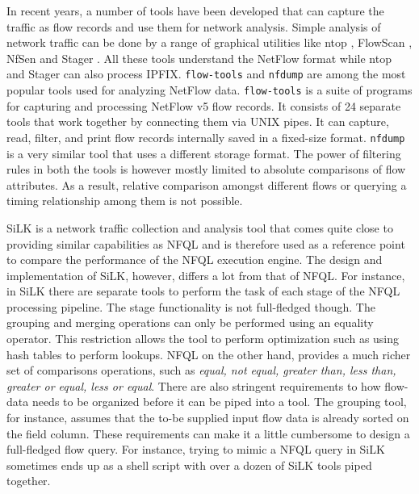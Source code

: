 In recent years, a number of tools have been developed that can capture the
traffic as flow records and use them for network analysis. Simple analysis of
network traffic can be done by a range of graphical utilities like ntop
\cite{ntop:2000}, FlowScan \cite{flowscan:2000}, NfSen \cite{phaag:2006} and
Stager \cite{oslebo:2006}. All these tools understand the NetFlow format while
ntop and Stager can also process \ac{IPFIX}. \texttt{flow-tools} and
\texttt{nfdump} are among the most popular tools used for analyzing NetFlow
data. \texttt{flow-tools} \cite{sromig:2000} is a suite of programs for
capturing and processing NetFlow v5 flow records. It consists of 24 separate
tools that work together by connecting them via UNIX pipes. It can capture,
read, filter, and print flow records internally saved in a fixed-size format.
\texttt{nfdump} \cite{phaag:2006} is a very similar tool that uses a different
storage format. The power of filtering rules in both the tools is however
mostly limited to absolute comparisons of flow attributes. As a result,
relative comparison amongst different flows or querying a timing relationship
among them is not possible.


SiLK \cite{SiLK} is a network traffic collection and analysis tool that comes
quite close to providing similar capabilities as \ac{NFQL} and is therefore
used as a reference point to compare the performance of the \ac{NFQL}
execution engine. The design and implementation of SiLK, however, differs a
lot from that of \ac{NFQL}. For instance, in SiLK there are separate tools to
perform the task of each stage of the \ac{NFQL} processing pipeline. The stage
functionality is not full-fledged though. The grouping and merging operations
can only be performed using an equality operator. This restriction allows the
tool to perform optimization such as using hash tables to perform lookups.
\ac{NFQL} on the other hand, provides a much richer set of comparisons
operations, such as \emph{equal, not equal, greater than, less than, greater
or equal, less or equal}. There are also stringent requirements to how
flow-data needs to be organized before it can be piped into a tool. The
grouping tool, for instance, assumes that the to-be supplied input flow data
is already sorted on the field column.  These requirements can make it a
little cumbersome to design a full-fledged flow query.  For instance, trying
to mimic a \ac{NFQL} query in SiLK sometimes ends up as a shell script with
over a dozen of SiLK tools piped together.
